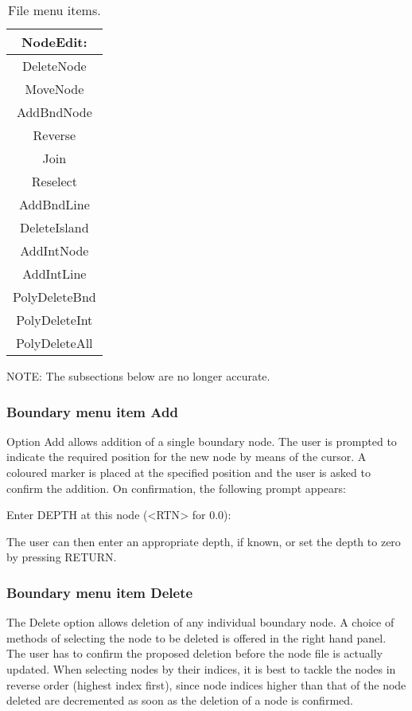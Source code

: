 \documentclass{article}
\begin{document}
\begin{table}[htb!]
 \caption{File menu items.}
  \begin{center}
   \begin{tabular}{|c|}
    \hline
NodeEdit:\\     \hline
DeleteNode \\ MoveNode \\     \hline
AddBndNode \\ Reverse \\ Join \\ Reselect \\ AddBndLine \\ DeleteIsland \\     \hline
AddIntNode \\ AddIntLine \\     \hline
PolyDeleteBnd \\ PolyDeleteInt \\ PolyDeleteAll \\
    \hline
   \end{tabular}
   \label{tab:NODEEDIT}
  \end{center}
\end{table}


NOTE: The subsections below are no longer accurate.

\subsubsection[Boundary menu item Add]{Boundary menu item Add}
Option Add allows addition of a single boundary node. The user is prompted to indicate the required position for the new node by means of the cursor. A coloured marker is placed at the specified position and the user is asked to confirm the addition. On confirmation, the following prompt appears:

Enter DEPTH at this node ({\textless}RTN{\textgreater} for 0.0):

The user can then enter an appropriate depth, if known, or set the depth to zero by pressing RETURN.

\subsubsection[Boundary menu item Delete]{Boundary menu item Delete}
The Delete option allows deletion of any individual boundary node. A choice of methods of selecting the node to be deleted is offered in the right hand panel. The user has to confirm the proposed deletion before the node file is actually updated. When selecting nodes by their indices, it is best to tackle the nodes in reverse order (highest index first), since node indices higher than that of the node deleted are decremented as soon as the deletion of a node is confirmed.
\end{document}
